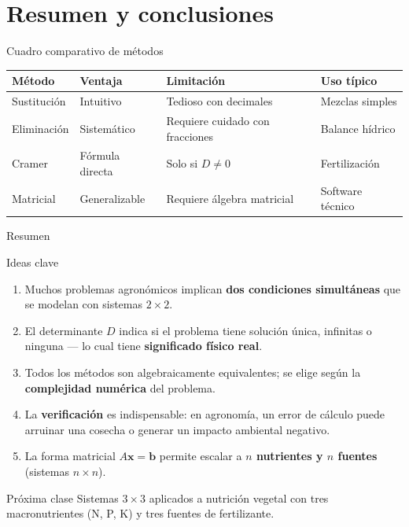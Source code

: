 \documentclass[11pt, aspectratio=169]{beamer}
\begin{document}
\section{Resumen y conclusiones}

\begin{frame}{Cuadro comparativo de métodos}
  \begin{table}
    \centering
    \renewcommand{\arraystretch}{1.4}
    \begin{tabular}{llll}
      \toprule
      \textbf{Método} & \textbf{Ventaja} & \textbf{Limitación}
        & \textbf{Uso típico} \\
      \midrule
      Sustitución  & Intuitivo       & Tedioso con decimales
        & Mezclas simples \\
      Eliminación  & Sistemático     & Requiere cuidado con fracciones
        & Balance hídrico \\
      Cramer        & Fórmula directa & Solo si $D \neq 0$
        & Fertilización \\
      Matricial    & Generalizable   & Requiere álgebra matricial
        & Software técnico \\
      \bottomrule
    \end{tabular}
  \end{table}
\end{frame}

\begin{frame}{Resumen}
  \begin{block}{Ideas clave}
    \begin{enumerate}
      \item Muchos problemas agronómicos implican \textbf{dos condiciones simultáneas}
        que se modelan con sistemas $2\times2$.
      \item El determinante $D$ indica si el problema tiene solución única,
        infinitas o ninguna --- lo cual tiene \textbf{significado físico real}.
      \item Todos los métodos son algebraicamente equivalentes;
        se elige según la \textbf{complejidad numérica} del problema.
      \item La \textbf{verificación} es indispensable: en agronomía,
        un error de cálculo puede arruinar una cosecha o generar un impacto ambiental negativo.
      \item La forma matricial $A\mathbf{x}=\mathbf{b}$ permite escalar a
        \textbf{$n$ nutrientes y $n$ fuentes} (sistemas $n\times n$).
    \end{enumerate}
  \end{block}

  \vspace{0.3em}
  \begin{exampleblock}{Próxima clase}
    Sistemas $3\times3$ aplicados a nutrición vegetal con tres macronutrientes
    (N, P, K) y tres fuentes de fertilizante.
  \end{exampleblock}
\end{frame}
\end{document}
